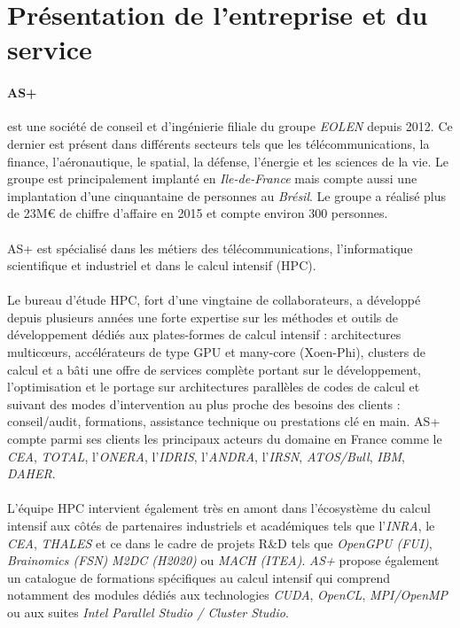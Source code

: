 \section{Présentation de l'entreprise et du service}
\paragraph{AS+}
est une société de conseil et d'ingénierie filiale du groupe \emph{EOLEN} depuis
2012. Ce dernier est présent dans différents secteurs tels que les
télécommunications, la finance, l'aéronautique, le spatial, la défense,
l'énergie et les sciences de la vie. Le groupe est principalement implanté en
\emph{Ile-de-France} mais compte aussi une implantation d'une cinquantaine de
personnes au \emph{Brésil}. Le groupe a réalisé plus de 23M\euro{} de chiffre
d'affaire en 2015 et compte environ 300 personnes.

\paragraph{}
AS+ est spécialisé dans les métiers des télécommunications, l'informatique
scientifique et industriel et dans le calcul intensif (HPC).

\paragraph{}
Le bureau d’étude HPC, fort d'une vingtaine de collaborateurs, a développé
depuis plusieurs années une forte expertise sur les méthodes et outils de
développement dédiés aux plates-formes de calcul intensif : architectures
multic\oe{}urs, accélérateurs de type GPU et many-core (Xoen-Phi), clusters de
calcul et a bâti une offre de services complète portant sur le développement,
l’optimisation et le portage sur architectures parallèles de codes de calcul et
suivant des modes d’intervention au plus proche des besoins des clients :
conseil/audit, formations, assistance technique ou prestations clé en main. AS+
compte parmi ses clients les principaux acteurs du domaine en France comme le
\emph{CEA}, \emph{TOTAL}, l’\emph{ONERA}, l’\emph{IDRIS}, l’\emph{ANDRA},
l’\emph{IRSN}, \emph{ATOS/Bull}, \emph{IBM}, \emph{DAHER}.

\paragraph{}
\sloppy
L’équipe HPC intervient également très en amont dans l’écosystème du calcul
intensif aux côtés de partenaires industriels et académiques tels que
l’\emph{INRA}, le \emph{CEA}, \emph{THALES} et ce dans le cadre de projets R\&D
tels que \emph{OpenGPU (FUI)}, \emph{Brainomics (FSN)} \emph{M2DC (H2020)} ou
\emph{MACH (ITEA)}. \emph{AS+} propose également un catalogue de formations
spécifiques au calcul intensif qui comprend notamment des modules dédiés aux
technologies \emph{CUDA}, \emph{OpenCL}, \emph{MPI/OpenMP} ou aux suites
\emph{Intel Parallel Studio / Cluster Studio}.

